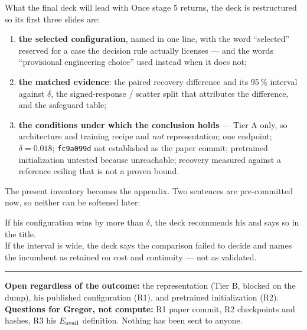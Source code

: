 \documentclass[aspectratio=169,10pt]{beamer}
\newcommand{\warn}[1]{\textcolor{warn}{#1}}
\begin{document}
\begin{frame}[t]{What the final deck will lead with}
  \vspace{0.4em}
  {\small Once stage 5 returns, the deck is restructured so its first three slides are:}
  \begin{enumerate}\small
    \item \textbf{the selected configuration}, named in one line, with the word
      ``selected'' reserved for a case the decision rule actually licenses --- and the
      words ``provisional engineering choice'' used instead when it does not;
    \item \textbf{the matched evidence}: the paired recovery difference and its 95\,\%
      interval against $\delta$, the signed-response / scatter split that attributes the
      difference, and the safeguard table;
    \item \textbf{the conditions under which the conclusion holds} --- Tier A only, so
      architecture and training recipe and \emph{not} representation; one endpoint;
      $\delta = 0.018$; \texttt{fc9a099d} not established as the paper commit; pretrained
      initialization untested because unreachable; recovery measured against a reference
      ceiling that is not a proven bound.
  \end{enumerate}
  \vspace{0.3em}
  {\small The present inventory becomes the appendix. Two sentences are pre-committed
  now, so neither can be softened later:}
  \vspace{0.2em}

  {\footnotesize
  \warn{If his configuration wins by more than $\delta$, the deck recommends his} and
  says so in the title.
  \\[0.2em]
  \warn{If the interval is wide, the deck says the comparison failed to decide} and
  names the incumbent as retained on cost and continuity --- not as validated.}
  \vspace{0.4em}
  \hrule
  \vspace{0.3em}
  {\footnotesize \textbf{Open regardless of the outcome:} the representation (Tier B,
  blocked on the dump), his published configuration (R1), and pretrained initialization
  (R2). \textbf{Questions for Gregor, not compute:} R1 paper commit, R2 checkpoints and
  hashes, R3 his $E_{\rm avail}$ definition. \warn{Nothing has been sent to anyone.}}
\end{frame}

\appendix
\end{document}
